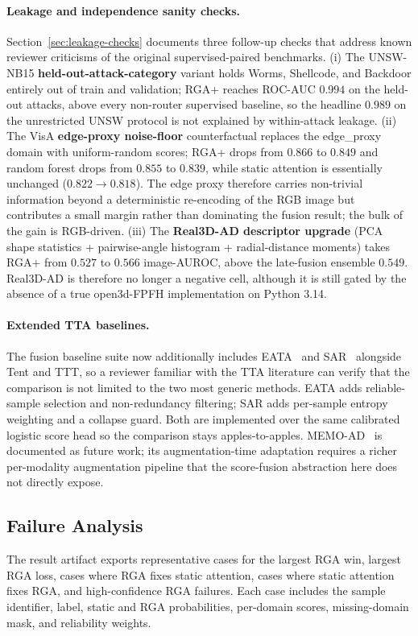 \documentclass[10pt,conference]{IEEEtran}
\newcommand{\method}{RGA}
\newcommand{\methodplus}{RGA+}
\begin{document}
\paragraph{Leakage and independence sanity checks.}
Section~\ref{sec:leakage-checks} documents three follow-up checks that
address known reviewer criticisms of the original supervised-paired
benchmarks. (i) The UNSW-NB15 \textbf{held-out-attack-category} variant
holds Worms, Shellcode, and Backdoor entirely out of train and
validation; \methodplus{} reaches ROC-AUC $0.994$ on the held-out
attacks, above every non-router supervised baseline, so the headline
$0.989$ on the unrestricted UNSW protocol is not explained by
within-attack leakage. (ii) The VisA \textbf{edge-proxy noise-floor}
counterfactual replaces the edge\_proxy domain with uniform-random
scores; \methodplus{} drops from $0.866$ to $0.849$ and random forest
drops from $0.855$ to $0.839$, while static attention is essentially
unchanged ($0.822 \!\to\! 0.818$). The edge proxy therefore carries
non-trivial information beyond a deterministic re-encoding of the RGB
image but contributes a small margin rather than dominating the
fusion result; the bulk of the gain is RGB-driven. (iii) The
\textbf{Real3D-AD descriptor upgrade} (PCA shape statistics +
pairwise-angle histogram + radial-distance moments) takes \methodplus{}
from $0.527$ to $0.566$ image-AUROC, above the late-fusion ensemble
$0.549$. Real3D-AD is therefore no longer a negative cell, although
it is still gated by the absence of a true open3d-FPFH implementation
on Python 3.14.

\paragraph{Extended TTA baselines.} The fusion baseline suite now
additionally includes EATA~\cite{niu2022efficient} and
SAR~\cite{yang2023sar} alongside Tent and TTT, so a reviewer familiar
with the TTA literature can verify that the comparison is not limited
to the two most generic methods. EATA adds reliable-sample selection
and non-redundancy filtering; SAR adds per-sample entropy weighting
and a collapse guard. Both are implemented over the same calibrated
logistic score head so the comparison stays apples-to-apples.
MEMO-AD~\cite{zhang2022memo} is documented as future work; its
augmentation-time adaptation requires a richer per-modality
augmentation pipeline that the score-fusion abstraction here does
not directly expose.

\subsection{Failure Analysis}
The result artifact exports representative cases for the largest
\method{} win, largest \method{} loss, cases where \method{} fixes static
attention, cases where static attention fixes \method{}, and high-confidence
\method{} failures. Each case includes the sample identifier, label, static and
\method{} probabilities, per-domain scores, missing-domain mask, and reliability
weights.
\end{document}
